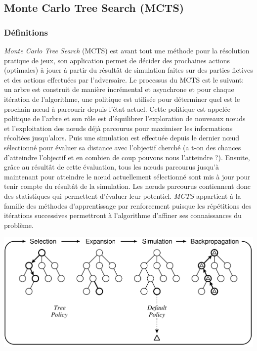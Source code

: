 \subsection{Monte Carlo Tree Search (MCTS)}

\subsubsection*{Définitions}
\textit{Monte Carlo Tree Search} (MCTS) est avant tout une méthode pour la résolution pratique de jeux, son application permet de décider des prochaines actions (optimales) à jouer à partir du résultât de simulation faites sur des parties fictives et des actions effectuées par l'adversaire.
Le processus du MCTS est le suivant: un arbre est construit de manière incrémental et asynchrone et pour chaque itération de l'algorithme, une politique est utilisée pour déterminer quel est le prochain nœud à parcourir depuis l'état actuel. Cette politique est appelée politique de l'arbre et son rôle est d'équilibrer l'exploration de nouveaux nœuds et l'exploitation des nœuds déjà parcourus pour maximiser les informations récoltées jusqu'alors. Puis une simulation est effectuée depuis le dernier nœud sélectionné pour évaluer sa distance avec l'objectif cherché (a t-on des chances d'atteindre l'objectif et en combien de coup pouvons nous l'atteindre ?). Ensuite, grâce au résultât de cette évaluation, tous les nœuds parcourus jusqu'à maintenant pour atteindre le nœud actuellement sélectionné sont mis à jour pour tenir compte du résultât de la simulation. Les nœuds parcourus contiennent donc des statistiques qui permettent d'évaluer leur potentiel.
\textit{MCTS} appartient à la famille des méthodes d'apprentissage par renforcement puisque les répétitions des itérations successives permettront à l'algorithme d'affiner ses connaissances du problème.

\begin{center}
    \includegraphics[scale=0.5]{../ressources/images/MCTS-example-iteration.png}
    \label{example-mcts-iteration}
\end{center}


